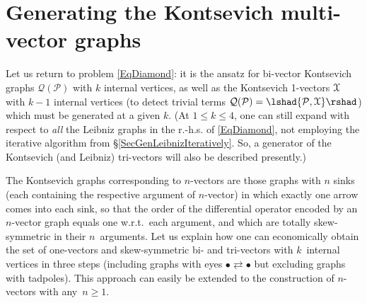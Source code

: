 \documentclass[a4paper]{jpconf}%
\theoremstyle{definition}
\theoremstyle{remark}
\newtheorem{rem}{Remark}%
\newcommand{\cP}{\mathcal{P}}\newcommand{\cR}{\mathcal{R}}
\newcommand{\cQ}{\mathcal{Q}}
\newcommand{\cX}{{\EuScript X}}    %
\newcommand{\schouten}[1]{\lshad {#1} \rshad}
\begin{document}


\section{Generating the Kontsevich multi\/-\/vector graphs}
\noindent%
Let us return to problem \eqref{EqDiamond}: it is the ansatz for bi\/-\/vector Kontsevich graphs $\cQ(\cP)$ with $k$ internal vertices, as well as the Kontsevich 1-vectors $\cX$ with $k-1$ internal vertices (to detect trivial terms $\cQ(\cP) = \schouten{\cP, \cX}$) which must be generated at a given $k$.
(At $1 \leqslant k \leqslant 4$, one can still expand with respect to \emph{all} the Leibniz graphs in the r.-h.s. of \eqref{EqDiamond}, not employing the iterative algorithm from \S\ref{SecGenLeibnizIteratively}.
So, a generator of the Kontsevich (and Leibniz) tri-vectors will also be described presently.)

The Kontsevich graphs corresponding to $n$-vectors are those graphs with $n$ sinks
(each containing the respective argument of $n$-\/vector) 
in which %
exactly one arrow comes into each sink, 
so that the order of the differential operator encoded by an $n$-\/vector graph 
equals one w.r.t.\ each argument, and which are totally skew-symmetric in their
$n$~arguments. 
Let us explain how one can economically obtain the set of one\/-\/vectors and
skew\/-\/symmetric bi\/- and tri\/-\/vectors with $k$~internal
vertices in three steps (including graphs with eyes $\bullet \rightleftarrows \bullet$
but excluding graphs with 
tadpoles). This approach can easily be extended to the construction of %
$n$-vectors with any~$n\geqslant1$. 
\end{document}
